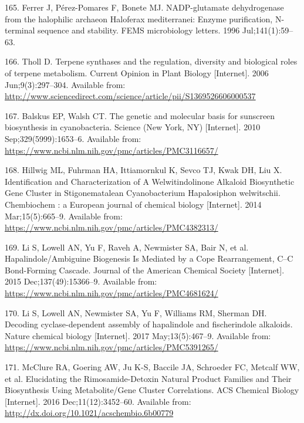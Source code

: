 \documentclass[12pt,twoside]{reedthesis}
\begin{document}
{  \hypertarget{ref-ferrer_nadp-glutamate_1996}{}
  165. Ferrer J, Pérez-Pomares F, Bonete MJ. NADP-glutamate dehydrogenase
  from the halophilic archaeon Haloferax mediterranei: Enzyme
  purification, N-terminal sequence and stability. FEMS microbiology
  letters. 1996 Jul;141(1):59--63.
  
  \hypertarget{ref-tholl_terpene_2006}{}
  166. Tholl D. Terpene synthases and the regulation, diversity and
  biological roles of terpene metabolism. Current Opinion in Plant Biology
  {[}Internet{]}. 2006 Jun;9(3):297--304. Available from:
  \url{http://www.sciencedirect.com/science/article/pii/S1369526606000537}
  
  \hypertarget{ref-balskus_genetic_2010}{}
  167. Balskus EP, Walsh CT. The genetic and molecular basis for sunscreen
  biosynthesis in cyanobacteria. Science (New York, NY) {[}Internet{]}.
  2010 Sep;329(5999):1653--6. Available from:
  \url{https://www.ncbi.nlm.nih.gov/pmc/articles/PMC3116657/}
  
  \hypertarget{ref-hillwig_identification_2014}{}
  168. Hillwig ML, Fuhrman HA, Ittiamornkul K, Sevco TJ, Kwak DH, Liu X.
  Identification and Characterization of A Welwitindolinone Alkaloid
  Biosynthetic Gene Cluster in Stigonematalean Cyanobacterium Hapalosiphon
  welwitschii. Chembiochem : a European journal of chemical biology
  {[}Internet{]}. 2014 Mar;15(5):665--9. Available from:
  \url{https://www.ncbi.nlm.nih.gov/pmc/articles/PMC4382313/}
  
  \hypertarget{ref-li_hapalindole_ambiguine_2015}{}
  169. Li S, Lowell AN, Yu F, Raveh A, Newmister SA, Bair N, et al.
  Hapalindole/Ambiguine Biogenesis Is Mediated by a Cope Rearrangement,
  C--C Bond-Forming Cascade. Journal of the American Chemical Society
  {[}Internet{]}. 2015 Dec;137(49):15366--9. Available from:
  \url{https://www.ncbi.nlm.nih.gov/pmc/articles/PMC4681624/}
  
  \hypertarget{ref-li_decoding_2017}{}
  170. Li S, Lowell AN, Newmister SA, Yu F, Williams RM, Sherman DH.
  Decoding cyclase-dependent assembly of hapalindole and fischerindole
  alkaloids. Nature chemical biology {[}Internet{]}. 2017
  May;13(5):467--9. Available from:
  \url{https://www.ncbi.nlm.nih.gov/pmc/articles/PMC5391265/}
  
  \hypertarget{ref-mcclure_elucidating_2016}{}
  171. McClure RA, Goering AW, Ju K-S, Baccile JA, Schroeder FC, Metcalf
  WW, et al. Elucidating the Rimosamide-Detoxin Natural Product Families
  and Their Biosynthesis Using Metabolite/Gene Cluster Correlations. ACS
  Chemical Biology {[}Internet{]}. 2016 Dec;11(12):3452--60. Available
  from: \url{http://dx.doi.org/10.1021/acschembio.6b00779}
  
}
\end{document}
